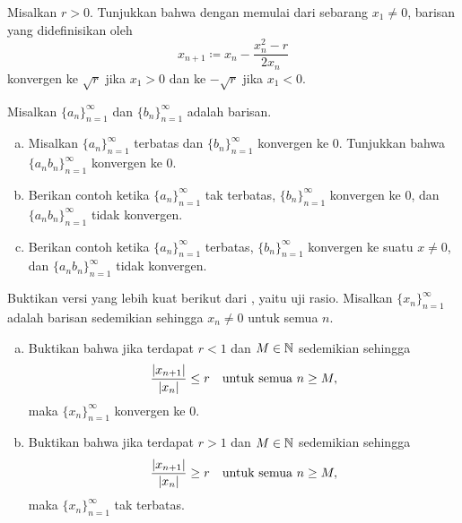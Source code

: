 \begin{exercise}
Misalkan $r > 0$.  Tunjukkan bahwa dengan memulai dari sebarang $x_1 \neq 0$, barisan
yang didefinisikan oleh
\begin{equation*}
x_{n+1} \coloneqq x_n - \frac{x_n^2-r}{2x_n}
\end{equation*}
konvergen ke $\sqrt{r}$ jika $x_1 > 0$ dan ke $-\sqrt{r}$ jika $x_1 < 0$.
\end{exercise}

\begin{samepage}
\begin{exercise}
Misalkan $\{ a_n \}_{n=1}^\infty$ dan $\{ b_n \}_{n=1}^\infty$ adalah barisan.
\begin{enumerate}[a)]
\item
Misalkan $\{ a_n \}_{n=1}^\infty$ terbatas dan $\{ b_n \}_{n=1}^\infty$ konvergen ke 0.
Tunjukkan bahwa $\{ a_n b_n \}_{n=1}^\infty$ konvergen ke 0.
\item
Berikan contoh ketika $\{ a_n \}_{n=1}^\infty$ tak terbatas, $\{ b_n \}_{n=1}^\infty$ konvergen ke
0, dan $\{ a_n b_n \}_{n=1}^\infty$ tidak konvergen.
\item
Berikan contoh ketika $\{ a_n \}_{n=1}^\infty$ terbatas, $\{ b_n \}_{n=1}^\infty$ konvergen ke
suatu $x \neq 0$, dan $\{ a_n b_n \}_{n=1}^\infty$ tidak konvergen.
\end{enumerate}
\end{exercise}
\end{samepage}

\begin{samepage}
\begin{exercise}[Mudah] \label{exercise:strongerratiotest1}
Buktikan versi yang lebih kuat berikut dari , yaitu uji
rasio.  
Misalkan $\{ x_n \}_{n=1}^\infty$ adalah barisan sedemikian sehingga $x_n \neq 0$ untuk semua
$n$.
\begin{enumerate}[a)]
\item
Buktikan bahwa jika terdapat $r < 1$ dan $M \in {\mathbb{N}}$ sedemikian sehingga
\begin{equation*}
\frac{\lvert {x_{n+1}} \rvert}{\lvert {x_n} \rvert} \leq r \quad \text{untuk semua } n \geq M,
\end{equation*}
maka $\{ x_n \}_{n=1}^\infty$ konvergen ke $0$.
\item
Buktikan bahwa jika terdapat $r > 1$ dan $M \in {\mathbb{N}}$ sedemikian sehingga
\begin{equation*}
\frac{\lvert {x_{n+1}} \rvert}{\lvert {x_n} \rvert} \geq r  \quad \text{untuk semua } n \geq M,
\end{equation*}
maka $\{ x_n \}_{n=1}^\infty$ tak terbatas.
\end{enumerate}
\end{exercise}
\end{samepage}


